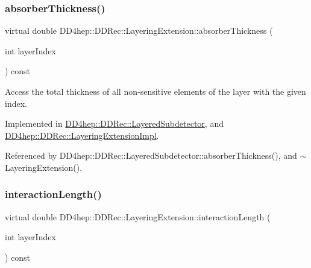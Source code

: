 \subsubsection{\texorpdfstring{absorber\+Thickness()}{absorberThickness()}}
{\footnotesize\ttfamily virtual double D\+D4hep\+::\+D\+D\+Rec\+::\+Layering\+Extension\+::absorber\+Thickness (\begin{DoxyParamCaption}\item[{int}]{layer\+Index }\end{DoxyParamCaption}) const\hspace{0.3cm}{\ttfamily [pure virtual]}}



Access the total thickness of all non-\/sensitive elements of the layer with the given index. 



Implemented in \hyperlink{class_d_d4hep_1_1_d_d_rec_1_1_layered_subdetector_a192ffcc5da25ec4041b504da260eeae5}{D\+D4hep\+::\+D\+D\+Rec\+::\+Layered\+Subdetector}, and \hyperlink{class_d_d4hep_1_1_d_d_rec_1_1_layering_extension_impl_a15a4c3dbf225ffc5958e19f1ae21439e}{D\+D4hep\+::\+D\+D\+Rec\+::\+Layering\+Extension\+Impl}.



Referenced by D\+D4hep\+::\+D\+D\+Rec\+::\+Layered\+Subdetector\+::absorber\+Thickness(), and $\sim$\+Layering\+Extension().

\hypertarget{class_d_d4hep_1_1_d_d_rec_1_1_layering_extension_aa7959c9c384c0f5ffcd066c5dc01514f}{}\label{class_d_d4hep_1_1_d_d_rec_1_1_layering_extension_aa7959c9c384c0f5ffcd066c5dc01514f} 
\subsubsection{\texorpdfstring{interaction\+Length()}{interactionLength()}}
{\footnotesize\ttfamily virtual double D\+D4hep\+::\+D\+D\+Rec\+::\+Layering\+Extension\+::interaction\+Length (\begin{DoxyParamCaption}\item[{int}]{layer\+Index }\end{DoxyParamCaption}) const\hspace{0.3cm}{\ttfamily [pure virtual]}}



